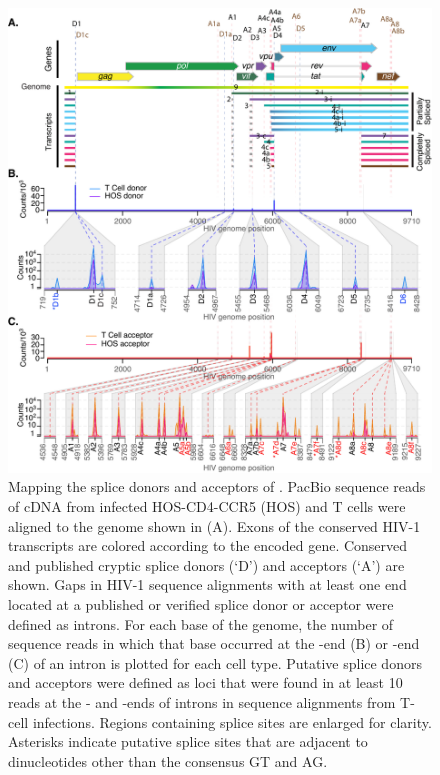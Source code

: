 \documentclass[../sherrill-Mix_thesis.tex]{subfiles}
\begin{document}
\begin{figure}
	\centering
	\includegraphics[width=.92\textwidth]{1.pdf}
	\caption[Mapping the splice donors and acceptors of \hivEight{}]{Mapping the splice donors and acceptors of \hivEight{}. PacBio sequence reads of \hivEight{} cDNA from infected HOS-CD4-CCR5 (HOS) and \cdFour{} T cells were aligned to the \hivEight{} genome shown in (A). Exons of the conserved HIV-1 transcripts are colored according to the encoded gene. Conserved and published cryptic splice donors (`D') and acceptors (`A') are shown. Gaps in HIV-1 sequence alignments with at least one end located at a published or verified splice donor or acceptor were defined as introns. For each base of the \hivEight{} genome, the number of sequence reads in which that base occurred at the \fivePrime{}-end (B) or \threePrime{}-end (C) of an intron is plotted for each cell type. Putative splice donors and acceptors were defined as loci that were found in at least 10 reads at the \fivePrime{}- and \threePrime{}-ends of introns in sequence alignments from T-cell infections. Regions containing splice sites are enlarged for clarity. Asterisks indicate putative splice sites that are adjacent to dinucleotides other than the consensus GT and AG.}
	\label{figDonorAccept}
\end{figure}
\end{document}
